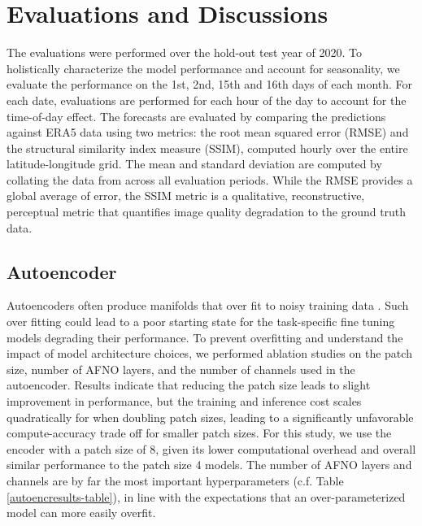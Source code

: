 \documentclass{article}
\begin{document}
\section{Evaluations and Discussions}

 The evaluations were performed over the hold-out test year of 2020. To holistically characterize the model performance and account for seasonality, we evaluate the performance on the 1st, 2nd, 15th and 16th days of each month. For each date, evaluations are performed for each hour of the day to account for the time-of-day effect. The forecasts are evaluated by comparing the predictions against ERA5 data using two metrics: the root mean squared error (RMSE) and the structural similarity index measure (SSIM), computed hourly over the entire latitude-longitude grid. The mean and standard deviation are computed by collating the data from across all evaluation periods. While the RMSE provides a global average of error, the SSIM metric is a qualitative, reconstructive, perceptual metric that quantifies image quality degradation to the ground truth data.

\subsection{Autoencoder}

Autoencoders often produce manifolds that over fit to noisy training data  \cite{lee2021neighborhood}. Such over fitting could lead to a poor starting state for the task-specific fine tuning models degrading their performance. To prevent overfitting and understand the impact of model architecture choices, we performed ablation studies on the patch size, number of AFNO layers, and the number of channels used in the autoencoder. Results indicate that reducing the patch size leads to slight improvement in performance, but the training and inference cost scales quadratically for when doubling patch sizes, leading to a significantly unfavorable compute-accuracy trade off for smaller patch sizes. For this study, we use the encoder with a patch size of 8, given its lower computational overhead and overall similar performance to the patch size 4 models. The number of AFNO layers and channels are by far the most important hyperparameters (c.f. Table \ref{autoencresults-table}), in line with the expectations that an over-parameterized model can more easily overfit.
\end{document}
